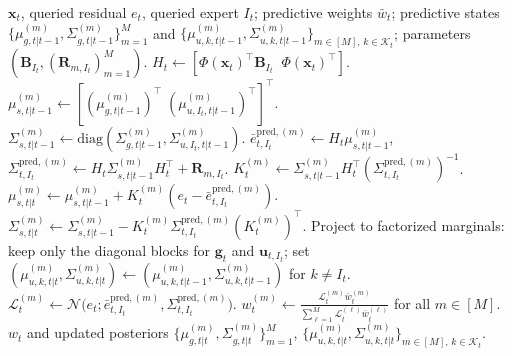 \begin{algorithm}[H]
\caption{\textsc{Correct}: Queried Kalman Update and Mode Posterior}
\label{alg:correct_reweight}
\begin{algorithmic}[1]
 \(\mathbf{x}_t\), queried residual \(e_t\), queried expert \(I_t\); predictive weights \(\bar w_t\); predictive states \(\{\mu^{(m)}_{g,t|t-1},\Sigma^{(m)}_{g,t|t-1}\}_{m=1}^M\) and \(\{\mu^{(m)}_{u,k,t|t-1},\Sigma^{(m)}_{u,k,t|t-1}\}_{m\in[M],\,k\in\mathcal{K}_t}\); parameters \((\mathbf{B}_{I_t},(\mathbf{R}_{m,I_t})_{m=1}^M)\).
\STATE \(H_t \leftarrow [\Phi(\mathbf{x}_t)^\top \mathbf{B}_{I_t}\;\;\Phi(\mathbf{x}_t)^\top]\).
    \STATE \(\mu^{(m)}_{s,t|t-1} \leftarrow [(\mu^{(m)}_{g,t|t-1})^\top\;(\mu^{(m)}_{u,I_t,t|t-1})^\top]^\top\).
    \STATE \(\Sigma^{(m)}_{s,t|t-1} \leftarrow \mathrm{diag}(\Sigma^{(m)}_{g,t|t-1},\Sigma^{(m)}_{u,I_t,t|t-1})\).
    \STATE \(\bar e_{t,I_t}^{\mathrm{pred},(m)} \leftarrow H_t\mu^{(m)}_{s,t|t-1}\),\quad
    \(\Sigma_{t,I_t}^{\mathrm{pred},(m)} \leftarrow H_t\Sigma^{(m)}_{s,t|t-1}H_t^\top + \mathbf{R}_{m,I_t}\).
    \STATE \(K_t^{(m)} \leftarrow \Sigma^{(m)}_{s,t|t-1}H_t^\top(\Sigma_{t,I_t}^{\mathrm{pred},(m)})^{-1}\).
    \STATE \(\mu^{(m)}_{s,t|t} \leftarrow \mu^{(m)}_{s,t|t-1} + K_t^{(m)}(e_t-\bar e_{t,I_t}^{\mathrm{pred},(m)})\).
    \STATE \(\Sigma^{(m)}_{s,t|t} \leftarrow \Sigma^{(m)}_{s,t|t-1} - K_t^{(m)}\Sigma_{t,I_t}^{\mathrm{pred},(m)}(K_t^{(m)})^\top\).
    \STATE Project to factorized marginals: keep only the diagonal blocks for \(\mathbf{g}_t\) and \(\mathbf{u}_{t,I_t}\); set \((\mu^{(m)}_{u,k,t|t},\Sigma^{(m)}_{u,k,t|t})\leftarrow(\mu^{(m)}_{u,k,t|t-1},\Sigma^{(m)}_{u,k,t|t-1})\) for \(k\neq I_t\).
    \STATE \(\mathcal{L}_t^{(m)} \leftarrow \mathcal{N}\!\big(e_t;\bar e_{t,I_t}^{\mathrm{pred},(m)},\Sigma_{t,I_t}^{\mathrm{pred},(m)}\big)\).
\ENDFOR
\STATE \(w_t^{(m)} \leftarrow \frac{\mathcal{L}_t^{(m)}\bar w_t^{(m)}}{\sum_{\ell=1}^M \mathcal{L}_t^{(\ell)}\bar w_t^{(\ell)}}\) for all \(m\in[M]\).
 \(w_t\) and updated posteriors \(\{\mu^{(m)}_{g,t|t},\Sigma^{(m)}_{g,t|t}\}_{m=1}^M\), \(\{\mu^{(m)}_{u,k,t|t},\Sigma^{(m)}_{u,k,t|t}\}_{m\in[M],\,k\in\mathcal{K}_t}\).
\end{algorithmic}
\end{algorithm}
